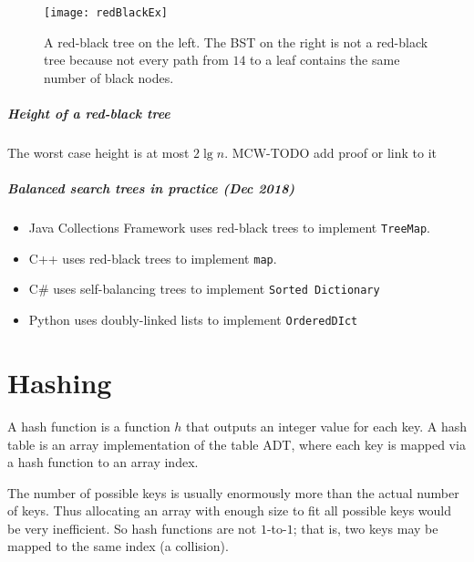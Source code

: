 \begin{figure}[htb]
  \centering
  \texttt{[image: redBlackEx]}
  \caption{A red-black tree on the left. The BST on the right is not a red-black tree 
  because not every path from $14$ to a leaf contains the same number of black nodes.}
  \label{fig:redblackTreeEx}
\end{figure} 

\paragraph{Height of a red-black tree}
The worst case height is at most $2 \lg n$.
MCW-TODO add proof or link to it

\paragraph{Balanced search trees in practice (Dec 2018)}
\begin{itemize}
\item Java Collections Framework uses red-black trees to implement \texttt{TreeMap}.
\item C++  uses red-black trees to implement \texttt{map}.
\item C\# uses self-balancing trees to implement \texttt{Sorted Dictionary}
\item Python uses doubly-linked lists to implement \texttt{OrderedDIct}
\end{itemize}




\chapter{Hashing} %

\begin{Definition}
A {hash function} is a function $h$ that outputs an integer
value for each key. A {hash table} is an array implementation of
the table ADT, where each key is mapped via a hash function to an array
index. 
\end{Definition}

The number of possible keys is usually enormously more than
the actual number of keys. Thus allocating an array with enough size to
fit all possible keys would be very inefficient. So hash functions are
not $1$-to-$1$; that is, two keys may be mapped to the same index (a
{collision}). 

